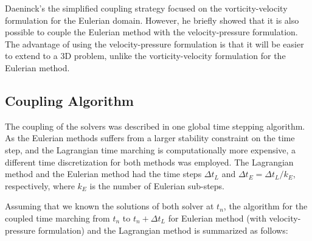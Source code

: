 	Daeninck's the simplified coupling strategy focused on the vorticity-velocity formulation for the Eulerian domain. However, he briefly showed that it is also possible to couple the Eulerian method with the velocity-pressure formulation. The advantage of using the velocity-pressure formulation is that it will be easier to extend to a 3D problem, unlike the vorticity-velocity formulation for the Eulerian method.
	
	\subsection{Coupling Algorithm}	
	\label{subsec:hybrid-ca}
	The coupling of the solvers was described in one global time stepping algorithm. As the Eulerian methods suffers from a larger stability constraint on the time step, and the Lagrangian time marching is computationally more expensive, a  different time discretization for both methods was employed. The Lagrangian method and the Eulerian method had the time steps $\Delta t_L$ and $\Delta t_E=\Delta t_L/k_E$, respectively, where $k_E$ is the number of Eulerian sub-steps.
	
	Assuming that we known the solutions of both solver at $t_n$, the algorithm for the coupled time marching from $t_n$ to $t_n+\Delta t_L$ for Eulerian method (with velocity-pressure formulation) and the Lagrangian method is summarized as follows:
	
